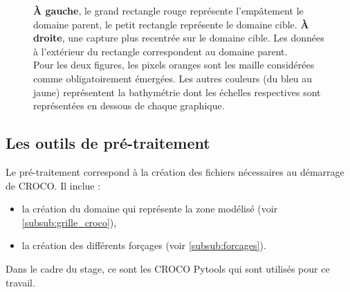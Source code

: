\documentclass[10pt,a4paper,titlepage]{article}
\begin{document}
\begin{figure}[h!]
{            \textbf{À gauche}, le grand rectangle rouge représente l'empâtement le domaine parent, le petit rectangle représente le domaine cible.
            \textbf{À droite}, une capture plus recentrée sur le domaine cible.
            Les données à l'extérieur du rectangle correspondent au domaine parent.
            \\
            Pour les deux figures, les pixels oranges sont les maille considérées comme obligatoirement émergées.
            Les autres couleurs (du bleu au jaune) représentent la bathymétrie dont les échelles respectives sont représentées en dessous de chaque graphique.
        }
        \label{fig:imbrication}
    \end{figure}
    
    
    \subsection{Les outils de pré-traitement}
    \label{sub:outils_pretraitement}
    
    Le pré-traitement correspond à la création des fichiers nécessaires au démarrage de CROCO.
    Il inclue :
    \begin{itemize}
        \item la création du domaine qui représente la zone modélisé (voir \ref{subsub:grille_croco}),
        \item la création des différents forçages (voir \ref{subsub:forcages}).
    \end{itemize}
    
    Dans le cadre du stage, ce sont les CROCO Pytools qui sont utilisés pour ce travail.
    
\end{document}
